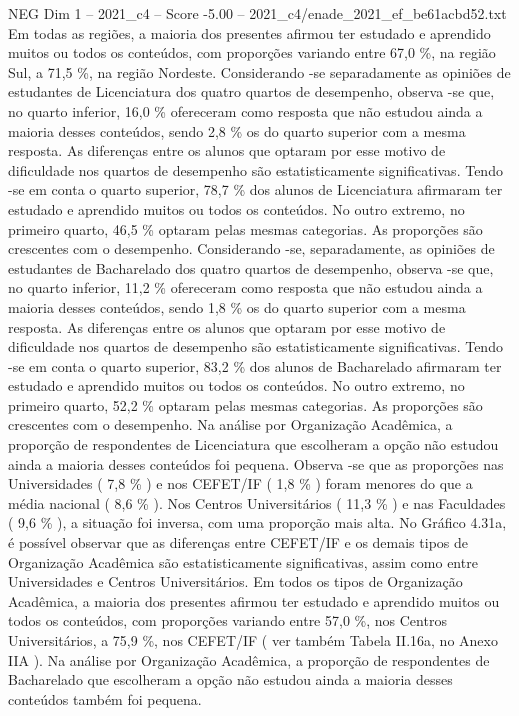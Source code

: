 \begin{textsample}{NEG Dim 1 – 2021\_c4 – Score -5.00 – 2021\_c4/enade\_2021\_ef\_be61acbd52.txt}
Em todas as regiões, a maioria dos presentes afirmou ter estudado e aprendido muitos ou todos os conteúdos, com proporções variando entre 67,0 \%, na região Sul, a 71,5 \%, na região Nordeste.
Considerando -se separadamente as opiniões de estudantes de Licenciatura dos quatro quartos de desempenho, observa -se que, no quarto inferior, 16,0 \% ofereceram como resposta que não estudou ainda a maioria desses conteúdos, sendo 2,8 \% os do quarto superior com a mesma resposta.
As diferenças entre os alunos que optaram por esse motivo de dificuldade nos quartos de desempenho são estatisticamente significativas.
Tendo -se em conta o quarto superior, 78,7 \% dos alunos de Licenciatura afirmaram ter estudado e aprendido muitos ou todos os conteúdos.
No outro extremo, no primeiro quarto, 46,5 \% optaram pelas mesmas categorias.
As proporções são crescentes com o desempenho.
Considerando -se, separadamente, as opiniões de estudantes de Bacharelado dos quatro quartos de desempenho, observa -se que, no quarto inferior, 11,2 \% ofereceram como resposta que não estudou ainda a maioria desses conteúdos, sendo 1,8 \% os do quarto superior com a mesma resposta.
As diferenças entre os alunos que optaram por esse motivo de dificuldade nos quartos de desempenho são estatisticamente significativas.
Tendo -se em conta o quarto superior, 83,2 \% dos alunos de Bacharelado afirmaram ter estudado e aprendido muitos ou todos os conteúdos.
No outro extremo, no primeiro quarto, 52,2 \% optaram pelas mesmas categorias.
As proporções são crescentes com o desempenho.
Na análise por Organização Acadêmica, a proporção de respondentes de Licenciatura que escolheram a opção não estudou ainda a maioria desses conteúdos foi pequena.
Observa -se que as proporções nas Universidades ( 7,8 \% ) e nos CEFET/IF ( 1,8 \% ) foram menores do que a média nacional ( 8,6 \% ).
Nos Centros Universitários ( 11,3 \% ) e nas Faculdades ( 9,6 \% ), a situação foi inversa, com uma proporção mais alta.
No Gráfico 4.31a, é possível observar que as diferenças entre CEFET/IF e os demais tipos de Organização Acadêmica são estatisticamente significativas, assim como entre Universidades e Centros Universitários.
Em todos os tipos de Organização Acadêmica, a maioria dos presentes afirmou ter estudado e aprendido muitos ou todos os conteúdos, com proporções variando entre 57,0 \%, nos Centros Universitários, a 75,9 \%, nos CEFET/IF ( ver também Tabela II.16a, no Anexo IIA ).
Na análise por Organização Acadêmica, a proporção de respondentes de Bacharelado que escolheram a opção não estudou ainda a maioria desses conteúdos também foi pequena.

\end{textsample}
